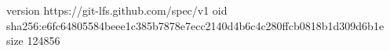 version https://git-lfs.github.com/spec/v1
oid sha256:e6fc64805584beee1c385b7878e7ecc2140d4b6c4c280ffcb0818b1d309d6b1e
size 124856
